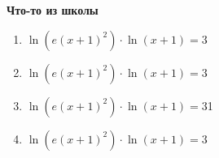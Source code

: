 \documentclass{article}
\begin{document}
\large
	
	
	\begin{center}
		\textbf{Что-то из школы}
	\end{center}
	
\begin{enumerate}[label*=\protect\fbox{\arabic{enumi}}]
	
\item $\ln(e(x+1)^2) \cdot \ln(x+1) = 3$

\item $\ln(e(x+1)^2) \cdot \ln(x+1) = 3$

\item $\ln(e(x+1)^2) \cdot \ln(x+1) = 3$1

\item $\ln(e(x+1)^2) \cdot \ln(x+1) = 3$



\end{enumerate}
\end{document}
